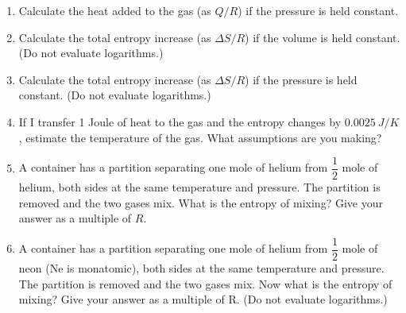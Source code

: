 \documentclass[fleqn]{article}
\begin{document}
\begin{enumerate}
    \item Calculate the heat added to the gas (as $Q/R$) if the pressure is held constant.


    \item Calculate the total entropy increase (as $\Delta S/R$) if the volume is held constant. (Do not evaluate
    logarithms.)


    \item Calculate the total entropy increase (as $\Delta S/R$) if the pressure is held constant. (Do not evaluate
    logarithms.)


    \item If I transfer 1 Joule of heat to the gas and the entropy changes by $0.0025 ~ J/K$, estimate the
    temperature of the gas. What assumptions are you making?


    \item A container has a partition separating one mole of helium from $\dfrac{1}{2}$ mole of helium, both sides at
    the same temperature and pressure. The partition is removed and the two gases mix. What is the entropy of 
    mixing? Give your answer as a multiple of $R$.


    \item A container has a partition separating one mole of helium from $\dfrac{1}{2}$ mole of neon 
    (Ne is monatomic), both sides at the same temperature and pressure. The partition is removed and 
    the two gases mix. Now what is the entropy of mixing? Give your answer as a multiple of R. (Do not evaluate
    logarithms.)


  \end{enumerate}
\end{document}
